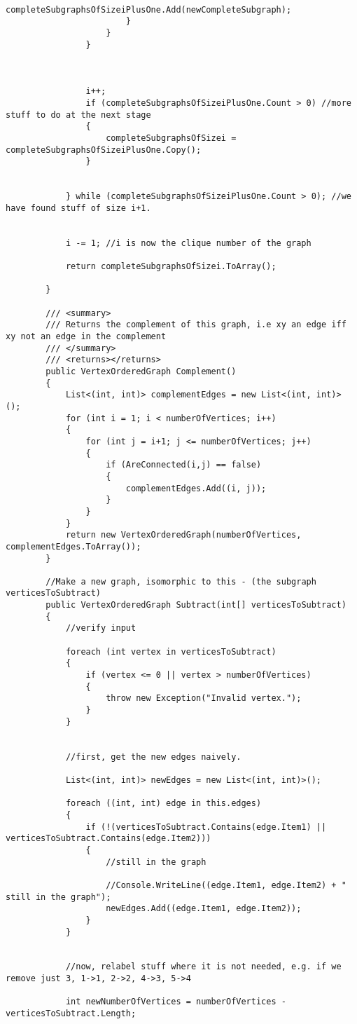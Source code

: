 \documentclass{article}
\begin{document}
\begin{lstlisting}
							completeSubgraphsOfSizeiPlusOne.Add(newCompleteSubgraph);
						}
					}
				}
				
				
				
				i++;
				if (completeSubgraphsOfSizeiPlusOne.Count > 0) //more stuff to do at the next stage
				{
					completeSubgraphsOfSizei = completeSubgraphsOfSizeiPlusOne.Copy();
				}
				
				
			} while (completeSubgraphsOfSizeiPlusOne.Count > 0); //we have found stuff of size i+1.
			
			
			i -= 1; //i is now the clique number of the graph
			
			return completeSubgraphsOfSizei.ToArray();
			
		}
		
		/// <summary>
		/// Returns the complement of this graph, i.e xy an edge iff xy not an edge in the complement
		/// </summary>
		/// <returns></returns>
		public VertexOrderedGraph Complement()
		{
			List<(int, int)> complementEdges = new List<(int, int)> ();
			for (int i = 1; i < numberOfVertices; i++)
			{
				for (int j = i+1; j <= numberOfVertices; j++)
				{
					if (AreConnected(i,j) == false)
					{
						complementEdges.Add((i, j));
					}
				}
			}
			return new VertexOrderedGraph(numberOfVertices, complementEdges.ToArray());
		}
		
		//Make a new graph, isomorphic to this - (the subgraph verticesToSubtract)
		public VertexOrderedGraph Subtract(int[] verticesToSubtract)
		{
			//verify input
			
			foreach (int vertex in verticesToSubtract)
			{
				if (vertex <= 0 || vertex > numberOfVertices)
				{
					throw new Exception("Invalid vertex.");
				}
			}
			
			
			//first, get the new edges naively.
			
			List<(int, int)> newEdges = new List<(int, int)>();
			
			foreach ((int, int) edge in this.edges)
			{
				if (!(verticesToSubtract.Contains(edge.Item1) || verticesToSubtract.Contains(edge.Item2)))
				{
					//still in the graph
					
					//Console.WriteLine((edge.Item1, edge.Item2) + " still in the graph");
					newEdges.Add((edge.Item1, edge.Item2));
				}
			}
			
			
			//now, relabel stuff where it is not needed, e.g. if we remove just 3, 1->1, 2->2, 4->3, 5->4
			
			int newNumberOfVertices = numberOfVertices - verticesToSubtract.Length;
			

\end{lstlisting}
\end{document}
